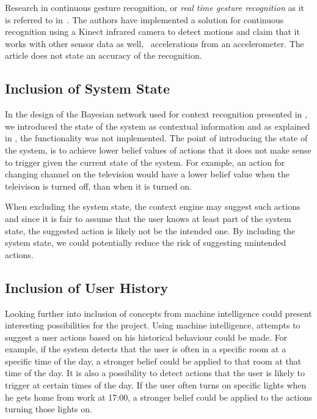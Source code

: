 Research in continuous gesture recognition, or \emph{real time gesture recognition} as it is referred to in~\cite{gillian2014gesture}. The authors have implemented a solution for continuous recognition using a Kinect infrared camera to detect motions and claim that it works with other sensor data as well, \eg~accelerations from an accelerometer. The article does not state an accuracy of the recognition.

\subsection{Inclusion of System State}

In the design of the Bayesian network used for context recognition presented in , we introduced the state of the system as contextual information and as explained in , the functionality was not implemented. The point of introducing the state of the system, is to achieve lower belief values of actions that it does not make sense to trigger given the current state of the system. For example, an action for changing channel on the television would have a lower belief value when the teleivison is turned off, than when it is turned on. 

When excluding the system state, the context engine may suggest such actions and since it is fair to assume that the user knows at least part of the system state, the suggested action is likely not be the intended one. By including the system state, we could potentially reduce the risk of suggesting unintended actions.

\subsection{Inclusion of User History}

Looking further into inclusion of concepts from machine intelligence could present interesting possibilities for the project. Using machine intelligence, attempts to suggest a user actions based on his historical behaviour could be made. For example, if the system detects that the user is often in a specific room at a specific time of the day, a stronger belief could be applied to that room at that time of the day. It is also a possibility to detect actions that the user is likely to trigger at certain times of the day. If the user often turns on specific lights when he gets home from work at 17:00, a stronger belief could be applied to the actions turning those lights on.

